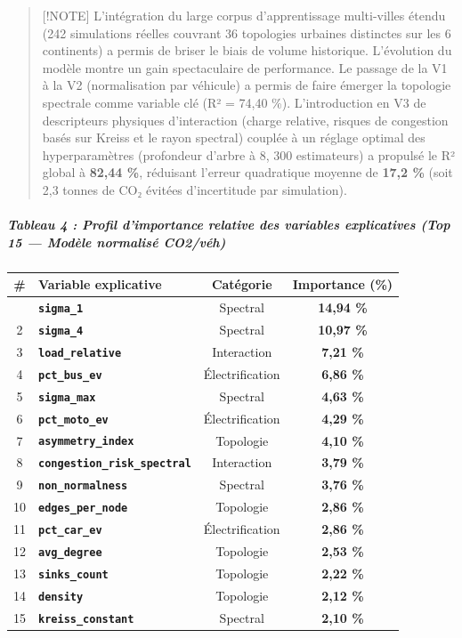 \documentclass[10pt, a4paper]{article}
\newcounter{none}
\begin{document}
\begin{quote}
{[}!NOTE{]} L'intégration du large corpus d'apprentissage multi-villes
étendu (242 simulations réelles couvrant 36 topologies urbaines
distinctes sur les 6 continents) a permis de briser le biais de volume
historique. L'évolution du modèle montre un gain spectaculaire de
performance. Le passage de la V1 à la V2 (normalisation par véhicule) a
permis de faire émerger la topologie spectrale comme variable clé (R² =
74,40 \%). L'introduction en V3 de descripteurs physiques d'interaction
(charge relative, risques de congestion basés sur Kreiss et le rayon
spectral) couplée à un réglage optimal des hyperparamètres (profondeur
d'arbre à 8, 300 estimateurs) a propulsé le R² global à \textbf{82,44
\%}, réduisant l'erreur quadratique moyenne de \textbf{17,2 \%} (soit
2,3 tonnes de CO₂ évitées d'incertitude par simulation).
\end{quote}

\subparagraph{Tableau 4 : Profil d'importance relative des variables
explicatives (Top 15 --- Modèle normalisé
CO2/véh)}\label{tableau-4-profil-dimportance-relative-des-variables-explicatives-top-15-moduxe8le-normalisuxe9-co2vuxe9h}

{\def\LTcaptype{none} %
\begin{longtable}[]{@{}clcc@{}}
\toprule\noalign{}
\# & Variable explicative & Catégorie & Importance (\%) \\
\midrule\noalign{}
\endhead
\bottomrule\noalign{}
\endlastfoot
1 & \textbf{\texttt{sigma\_1}} & Spectral & \textbf{14,94 \%} \\
2 & \textbf{\texttt{sigma\_4}} & Spectral & \textbf{10,97 \%} \\
3 & \textbf{\texttt{load\_relative}} & Interaction & \textbf{7,21 \%} \\
4 & \textbf{\texttt{pct\_bus\_ev}} & Électrification & \textbf{6,86
\%} \\
5 & \textbf{\texttt{sigma\_max}} & Spectral & \textbf{4,63 \%} \\
6 & \textbf{\texttt{pct\_moto\_ev}} & Électrification & \textbf{4,29
\%} \\
7 & \textbf{\texttt{asymmetry\_index}} & Topologie & \textbf{4,10 \%} \\
8 & \textbf{\texttt{congestion\_risk\_spectral}} & Interaction &
\textbf{3,79 \%} \\
9 & \textbf{\texttt{non\_normalness}} & Spectral & \textbf{3,76 \%} \\
10 & \textbf{\texttt{edges\_per\_node}} & Topologie & \textbf{2,86
\%} \\
11 & \textbf{\texttt{pct\_car\_ev}} & Électrification & \textbf{2,86
\%} \\
12 & \textbf{\texttt{avg\_degree}} & Topologie & \textbf{2,53 \%} \\
13 & \textbf{\texttt{sinks\_count}} & Topologie & \textbf{2,22 \%} \\
14 & \textbf{\texttt{density}} & Topologie & \textbf{2,12 \%} \\
15 & \textbf{\texttt{kreiss\_constant}} & Spectral & \textbf{2,10 \%} \\
\end{longtable}
}
\end{document}
